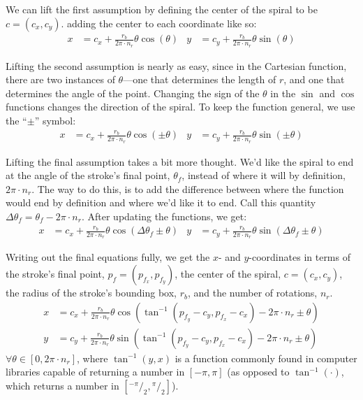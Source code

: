 \documentclass{article}
\newcommand{\lfrac}[2]{\ensuremath{^#1/_#2}}
\begin{document}
We can lift the first assumption by defining the center of the spiral to be $c=(c_x,c_y)$. adding the center to each coordinate like so:
\begin{align*}
  x &= c_x + \frac{r_b}{2\pi \cdot n_r}\theta\cos(\theta) &
  y &= c_y + \frac{r_b}{2\pi \cdot n_r}\theta\sin(\theta)
\end{align*}

Lifting the second assumption is nearly as easy, since in the Cartesian function, there are two instances of $\theta$---one that determines the length of $r$, and one that determines the angle of the point.  Changing the sign of the $\theta$ in the $\sin$ and $\cos$ functions changes the direction of the spiral.  To keep the function general, we use the ``$\pm$'' symbol:
\begin{align*}
  x &= c_x + \frac{r_b}{2\pi \cdot n_r}\theta\cos(\pm\theta) &
  y &= c_y + \frac{r_b}{2\pi \cdot n_r}\theta\sin(\pm\theta)
\end{align*}

Lifting the final assumption takes a bit more thought.  We'd like the spiral to end at the angle of the stroke's final point, $\theta_f$, instead of where it will by definition, $2\pi\cdot n_r$.  The way to do this, is to add the difference between where the function would end by definition and where we'd like it to end.  Call this quantity $\Delta\theta_f=\theta_f-2\pi\cdot n_r$.  After updating the functions, we get:
\begin{align*}
  x &= c_x + \frac{r_b}{2\pi \cdot n_r}\theta\cos(\Delta\theta_f\pm\theta) &
  y &= c_y + \frac{r_b}{2\pi \cdot n_r}\theta\sin(\Delta\theta_f\pm\theta)
\end{align*}

Writing out the final equations fully, we get the $x$- and $y$-coordinates in terms of the stroke's final point, $p_f=(p_{f_x},p_{f_y})$, the center of the spiral, $c=(c_x,c_y)$, the radius of the stroke's bounding box, $r_b$, and the number of rotations, $n_r$.
\begin{align*}
  x &= c_x + \frac{r_b}{2\pi \cdot n_r}\theta\cos(\tan^{-1}(p_{f_y}-c_y,p_{f_x}-c_x)-2\pi\cdot n_r\pm\theta) \\
  y &= c_y + \frac{r_b}{2\pi \cdot n_r}\theta\sin(\tan^{-1}(p_{f_y}-c_y,p_{f_x}-c_x)-2\pi\cdot n_r\pm\theta)
\end{align*}
$\forall\theta\in[0,2\pi\cdot n_r]$, where $\tan^{-1}(y,x)$ is a function commonly found in computer libraries capable of returning a number in $[-\pi,\pi]$ (as opposed to $\tan^{-1}(\cdot)$, which returns a number in $\left[\lfrac{{-\pi}}{2}, \lfrac{\pi}{2}\right]$).
\end{document}
